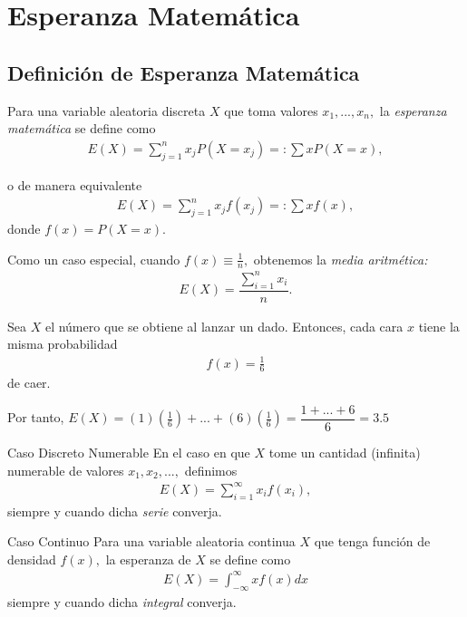 \section{Esperanza Matemática}

\subsection{Definición de Esperanza Matemática}


  Para una variable aleatoria discreta $X$ que toma valores $x_{1},...,x_{n},$ la \emph{esperanza matemática} se define como
  \begin{align}
   \label{eq:0.3.1}
   E(X)=\sum _{j=1}^{n} x_{j}P(X=x_{j})=:\sum xP(X=x),
  \end{align}

o de manera equivalente
  \begin{align}
   \label{eq:0.3.2}
   E(X)=\sum _{j=1}^{n} x_{j}f(x_{j})=:\sum xf(x),
  \end{align}
  donde $f(x)=P(X=x).$



 Como un caso especial, cuando $f(x)\equiv \frac{1}{n},$ obtenemos la \emph{media aritmética:}
 \begin{align}
  \label{eq:0.3.3}
  E(X)=\dfrac{\sum_{i=1}^{n}x_{i}}{n}.
 \end{align}


{}
\begin{ejemplo}
 Sea $X$ el número que se obtiene al lanzar un dado.  Entonces, cada cara $x$ tiene la misma probabilidad
 \begin{align}
 f(x) = \frac{1}{6}
\end{align} de caer.


Por tanto,
$E(X)= (1)\left( \frac{1}{6} \right)+...+(6)\left( \frac{1}{6} \right) = \dfrac{1+...+6}{6} = 3.5$
\end{ejemplo}



{Caso Discreto Numerable}
 En el caso en que $X$ tome un cantidad (infinita) numerable de valores $x_{1},x_{2},...,$ definimos
 \begin{align}
  E(X)=\sum_{i=1}^{\infty}x_{i}f(x_{i}),
 \end{align}
siempre y cuando dicha \emph{serie} converja.


%
%
% 

{Caso Continuo}
 Para una variable aleatoria continua $X$ que tenga función de densidad $f(x),$ la esperanza de $X$ se define como
 \begin{align}
  \label{eq:0.3.4}
  E(X)=\int_{-\infty}^{\infty}xf(x)dx
 \end{align}
siempre y cuando dicha \emph{integral} converja.


